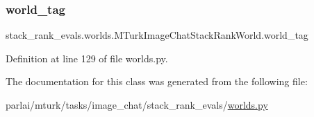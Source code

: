 \subsubsection{\texorpdfstring{world\+\_\+tag}{world\_tag}}
{\footnotesize\ttfamily stack\+\_\+rank\+\_\+evals.\+worlds.\+M\+Turk\+Image\+Chat\+Stack\+Rank\+World.\+world\+\_\+tag}



Definition at line 129 of file worlds.\+py.



The documentation for this class was generated from the following file\+:\begin{DoxyCompactItemize}
\item 
parlai/mturk/tasks/image\+\_\+chat/stack\+\_\+rank\+\_\+evals/\hyperlink{parlai_2mturk_2tasks_2image__chat_2stack__rank__evals_2worlds_8py}{worlds.\+py}\end{DoxyCompactItemize}
